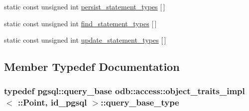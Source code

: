 \begin{DoxyCompactItemize}
\item 
static const unsigned int \hyperlink{classodb_1_1access_1_1object__traits__impl_3_01_1_1_point_00_01id__pgsql_01_4_a5e2953beb5bdfe9e35c046dc70a7e12d}{persist\+\_\+statement\+\_\+types} \mbox{[}$\,$\mbox{]}
\item 
static const unsigned int \hyperlink{classodb_1_1access_1_1object__traits__impl_3_01_1_1_point_00_01id__pgsql_01_4_a85f012e97777db28915d87edcee26e0c}{find\+\_\+statement\+\_\+types} \mbox{[}$\,$\mbox{]}
\item 
static const unsigned int \hyperlink{classodb_1_1access_1_1object__traits__impl_3_01_1_1_point_00_01id__pgsql_01_4_aa05a7c6270a4f28a1a1bc9b7fc1dff83}{update\+\_\+statement\+\_\+types} \mbox{[}$\,$\mbox{]}
\end{DoxyCompactItemize}


\subsection{Member Typedef Documentation}
\hypertarget{classodb_1_1access_1_1object__traits__impl_3_01_1_1_point_00_01id__pgsql_01_4_a37783d97a2a77476482f2da2298d39ce}{}
\subsubsection[{query\+\_\+base\+\_\+type}]{\setlength{\rightskip}{0pt plus 5cm}typedef pgsql\+::query\+\_\+base odb\+::access\+::object\+\_\+traits\+\_\+impl$<$ \+::{\bf Point}, id\+\_\+pgsql $>$\+::{\bf query\+\_\+base\+\_\+type}}\label{classodb_1_1access_1_1object__traits__impl_3_01_1_1_point_00_01id__pgsql_01_4_a37783d97a2a77476482f2da2298d39ce}
\hypertarget{classodb_1_1access_1_1object__traits__impl_3_01_1_1_point_00_01id__pgsql_01_4_a41c7a102d251fa1e0931ff84448cf466}{}
